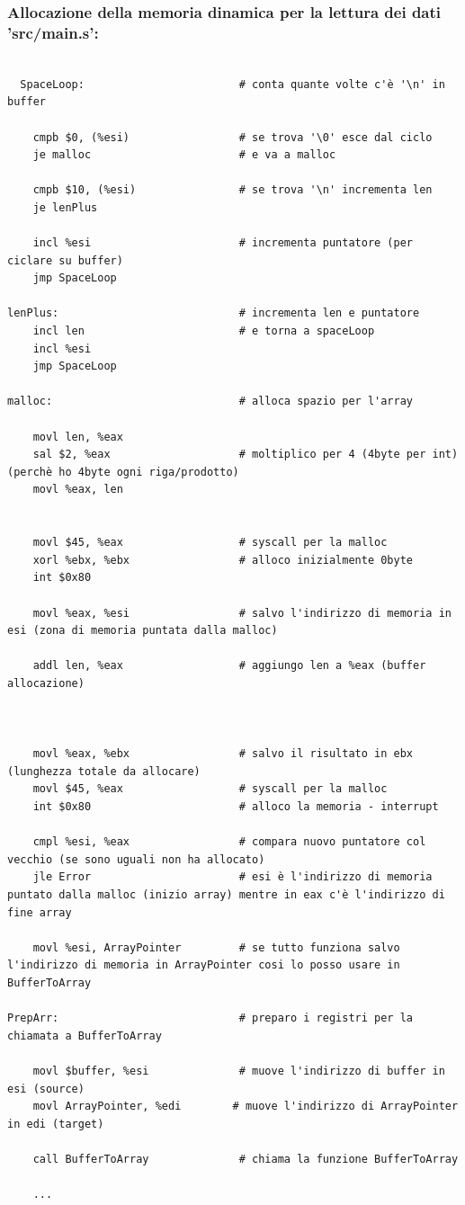 \documentclass[a4paper]{report}
\begin{document}
\subsubsection{Allocazione della memoria dinamica per la lettura dei dati 'src/main.s':}
\begin{lstlisting}[firstnumber=91]

  SpaceLoop:                        # conta quante volte c'è '\n' in buffer
        
    cmpb $0, (%esi)                 # se trova '\0' esce dal ciclo
    je malloc                       # e va a malloc
    
    cmpb $10, (%esi)                # se trova '\n' incrementa len
    je lenPlus  
    
    incl %esi                       # incrementa puntatore (per ciclare su buffer)
    jmp SpaceLoop   
    
lenPlus:                            # incrementa len e puntatore
    incl len                        # e torna a spaceLoop
    incl %esi   
    jmp SpaceLoop   
    
malloc:                             # alloca spazio per l'array

    movl len, %eax
    sal $2, %eax                    # moltiplico per 4 (4byte per int) (perchè ho 4byte ogni riga/prodotto)     
    movl %eax, len


    movl $45, %eax                  # syscall per la malloc
    xorl %ebx, %ebx                 # alloco inizialmente 0byte
    int $0x80   
    
    movl %eax, %esi                 # salvo l'indirizzo di memoria in esi (zona di memoria puntata dalla malloc)
    
    addl len, %eax                  # aggiungo len a %eax (buffer allocazione)
                                                              
    
    
    movl %eax, %ebx                 # salvo il risultato in ebx (lunghezza totale da allocare)
    movl $45, %eax                  # syscall per la malloc
    int $0x80                       # alloco la memoria - interrupt
    
    cmpl %esi, %eax                 # compara nuovo puntatore col vecchio (se sono uguali non ha allocato)
    jle Error                       # esi è l'indirizzo di memoria puntato dalla malloc (inizio array) mentre in eax c'è l'indirizzo di fine array
    
    movl %esi, ArrayPointer         # se tutto funziona salvo l'indirizzo di memoria in ArrayPointer cosi lo posso usare in BufferToArray
    
PrepArr:                            # preparo i registri per la chiamata a BufferToArray
    
    movl $buffer, %esi              # muove l'indirizzo di buffer in esi (source)
    movl ArrayPointer, %edi        # muove l'indirizzo di ArrayPointer in edi (target)
    
    call BufferToArray              # chiama la funzione BufferToArray

    ...

\end{lstlisting}
\end{document}
